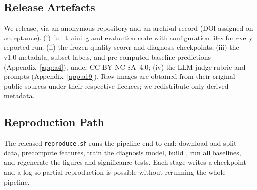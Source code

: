 \subsection{Release Artefacts}\label{app:a26-release}
We release, via an anonymous repository and an archival record (DOI assigned on acceptance):
(i) full training and evaluation code with configuration files for every reported run;
(ii) the frozen quality-scorer and diagnosis checkpoints;
(iii) the \itb v1.0 metadata, subset labels, and pre-computed baseline predictions
(Appendix~\ref{app:a4}), under CC-BY-NC-SA~4.0;
(iv) the LLM-judge rubric and prompts (Appendix~\ref{app:a19}).
Raw images are obtained from their original public sources under their respective licences; we
redistribute only derived metadata.

\subsection{Reproduction Path}\label{app:a26-path}
The released \texttt{reproduce.sh} runs the pipeline end to end: download and split data, precompute
features, train the diagnosis model, build \itb, run all baselines, and regenerate the figures and
significance tests. Each stage writes a checkpoint and a log so partial reproduction is possible
without rerunning the whole pipeline.

